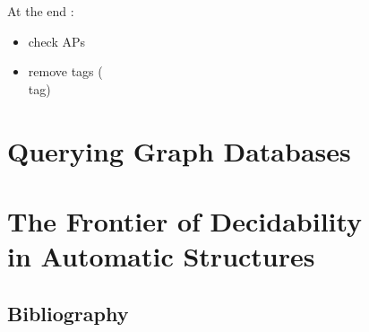 \documentclass[a4paper,sfsidenotes,twoside,justified,nobib]{tufte-book-custom}
\begin{document}
At the end :
\begin{itemize}
	\item check APs 
	\item remove tags (\textsf{\\tag})
\end{itemize}





\part{Querying Graph Databases}
\label{part:databases}






\part[The Frontier of Decidability in Automatic Structures]{The Frontier of Decidability\\in Automatic Structures}
\label{part:automatic}






\backmatter
\chapter*{Bibliography}
\printbibliography[heading=none]
\end{document}
